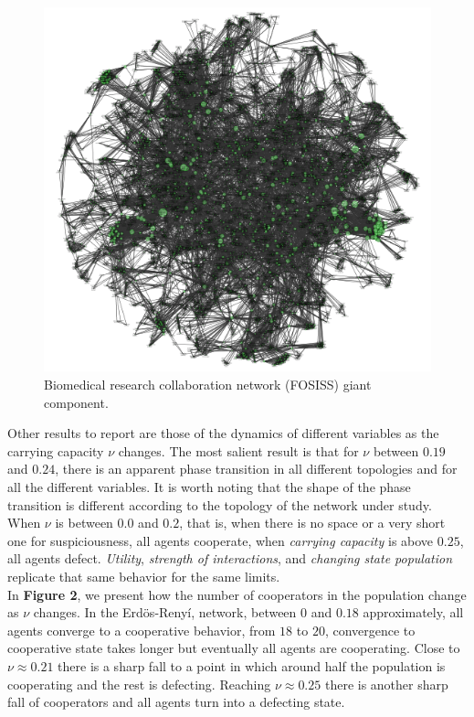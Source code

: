 \documentclass[11pt]{article}
\begin{document}
\begin{figure} [h!]
\centering
\includegraphics[scale=0.5]{images/Fosiss_GC_final.png}
\caption{Biomedical research collaboration network (FOSISS) giant component.}\label{Fosiss_GC}
\end{figure}

\FloatBarrier

Other results to report are those of the dynamics of different
variables as the carrying capacity $\nu$ changes. The  most salient
result is that for $\nu$ between $0.19$ and $0.24$, there is an
apparent phase transition in all different topologies and for all the
different variables. It is worth noting that the shape
of the phase transition is different according to the topology of the
network under study. When $\nu$ is between $0.0$ and $0.2$, that is, when there is
no space or a very short one for suspiciousness, all agents cooperate, when
\textit{carrying capacity} is above $0.25$, all agents defect. \textit{Utility},
\textit{strength of interactions}, and \textit{changing state population}
replicate that same behavior for the same limits. \\ 

In \textbf{Figure 2}, we present how the number of cooperators in the population
change as $\nu$ changes. In the Erd\"{o}s-Reny\'i, network, between $0$ and
$0.18$ approximately, all agents converge to a cooperative behavior, from $18$
to $20$, convergence to cooperative state takes longer but eventually all agents
are cooperating. Close to $\nu \approx 0.21$ there is a sharp fall to a point in
which around half the population is cooperating and the rest is
defecting. Reaching $\nu \approx 0.25$ there is another sharp fall of
cooperators and all agents turn into a defecting state.\\
\end{document}
